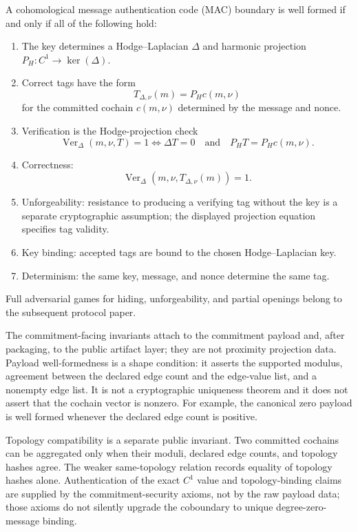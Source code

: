 \begin{definition}\label{def:cohomological-mac-boundary}
  A cohomological message authentication code (MAC) boundary is well formed
  if and only if all of the
  following hold:
  \begin{enumerate}[label=(\roman*)]
    \item The key determines a Hodge--Laplacian \(\Delta\) and harmonic
      projection \(P_H:C^1\to\ker(\Delta)\).
    \item Correct tags have the form
      \[
        T_{\Delta,\nu}(m)=P_H c(m,\nu)
      \]
      for the committed cochain \(c(m,\nu)\) determined by the message and
      nonce.
    \item Verification is the Hodge-projection check
      \[
        \operatorname{Ver}_\Delta(m,\nu,T)=1
        \Longleftrightarrow
        \Delta T=0
        \quad\text{and}\quad
        P_HT=P_Hc(m,\nu).
      \]
    \item Correctness:
      \[
        \operatorname{Ver}_\Delta(m,\nu,T_{\Delta,\nu}(m))=1.
      \]
    \item Unforgeability: resistance to producing a verifying tag without the
      key is a separate cryptographic assumption; the displayed projection
      equation specifies tag validity.
    \item Key binding: accepted tags are bound to the chosen
      Hodge--Laplacian key.
    \item Determinism: the same key, message, and nonce determine the same tag.
  \end{enumerate}
\end{definition}

Full adversarial games for hiding, unforgeability, and partial openings belong
to the subsequent protocol paper.

The commitment-facing invariants attach to the commitment payload and, after
packaging, to the public artifact layer; they are not proximity projection data.
Payload well-formedness is a shape condition: it asserts the supported modulus,
agreement between the declared edge count and the edge-value list, and a
nonempty edge list. It is not a cryptographic uniqueness theorem and it does
not assert that the cochain vector is nonzero. For example, the canonical zero
payload is well formed whenever the declared edge count is positive.

Topology compatibility is a separate public invariant. Two committed cochains
can be aggregated only when their moduli, declared edge counts, and topology
hashes agree. The weaker same-topology relation records equality of topology
hashes alone. Authentication of the exact \(C^1\) value and topology-binding
claims are supplied by the commitment-security axioms, not by the raw payload
data; those axioms do not silently upgrade the coboundary to unique
degree-zero-message binding.

